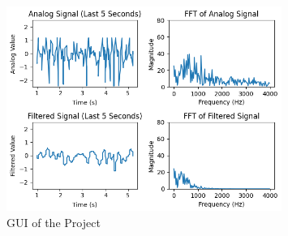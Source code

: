 \begin{figure}[h]
    \centering
    \includegraphics[width=0.8\textwidth]{assets/plots.png}
    \caption{GUI of the Project}
    \label{fig:gui}
\end{figure}

